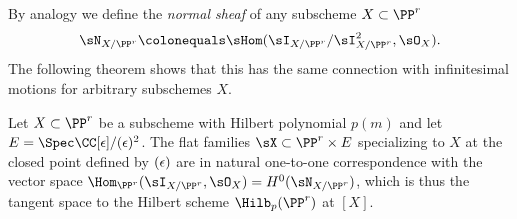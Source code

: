 By analogy we define the
\emph{normal sheaf} of any subscheme $X\subset
\index{normal sheaf}%
\PP^r$
$$
\sN_{X/\PP^r} \colonequals  \sHom(\sI_{X/\PP^r}/\sI_{X/\PP^r}^2, \sO_X).
$$
The following theorem shows that this
has the same connection with infinitesimal motions for arbitrary
subschemes $X$.

\begin{theorem}
\label{tangent space of Hilb}
Let $X\subset \PP^r$ be a subscheme with Hilbert polynomial $p(m)$ and let
$E = \Spec\CC[\eps]/(\eps)^{2}$. The flat families
$\sX \subset \PP^r\times E$ specializing to $X$ at the closed point
defined by $(\eps)$
are in natural one-to-one correspondence with the vector space
%
$\Hom_{\PP^r}(\sI_{X/\PP^r}, \sO_X) = H^0(\sN_{X/\PP^r})$, which is thus
the tangent space to the Hilbert scheme $\Hilb_{p}(\PP^r)$ at $[X]$.
\end{theorem}

